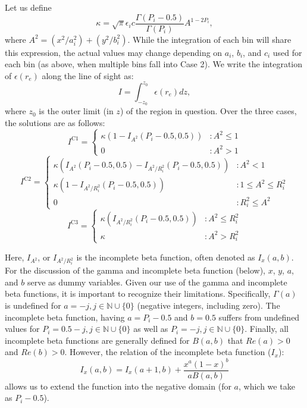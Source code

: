 \documentclass[twocolumn,traditabstract]{aa}
\begin{document}
Let us define
\begin{equation}
  \kappa = \sqrt{\pi}\epsilon_i c \frac{\Gamma(P_i-0.5)}{\Gamma(P_i)}A^{1-2P_i},
\end{equation}
where $A^2 = (x^2 / a_i^2) + (y^2 / b_i^2)$. While the integration of each bin will share this expression,
the actual values may change depending on $a_i$, $b_i$, and $c_i$ used for
each bin (as above, when multiple bins fall into Case 2). We write the  integration of $\epsilon(r_e)$ along the line of sight as:
\begin{equation}
  I = \int_{-z_0}^{z_0} \epsilon(r_e) dz,
  \label{eqn:los_int_setup}
\end{equation}
where $z_0$ is the outer limit (in $z$) of the region in question. Over the three cases, the solutions are as follows:
\begin{equation}
  I^{\text{C1}} = \left\{
  \begin{array}{lr}
    \kappa (1-I_{A^2}(P_i-0.5,0.5)) &: A^2 \leq 1 \\
    0 &: A^2 > 1
  \end{array}
  \right.
  \label{eqn:case1_int}
\end{equation}
\begin{equation}
  I^{\text{C2}} = \left\{
  \begin{array}{lr}
    \kappa (I_{A^2}(P_i-0.5,0.5)-I_{A^2/R_i^2}(P_i-0.5,0.5)) &: A^2 < 1 \\
    \kappa (1-I_{A^2/R_i^2}(P_i-0.5,0.5)) &: 1 \leq A^2 \leq R_i^2 \\
    0 &: R_i^2 \leq A^2
  \end{array}
  \right.
\end{equation}
\begin{equation}
  I^{\text{C3}} = \left\{
  \begin{array}{lr}
    \kappa (I_{A^2/R_i^2}(P_i-0.5,0.5)) &: A^2 \leq R_i^2 \\
    \kappa &: A^2 > R_i^2
  \end{array}
  \right.
\end{equation}

Here, $I_{A^2}$, or $I_{A^2/R_i^2}$ is the incomplete beta function, often denoted as $I_x(a,b)$. For the discussion of
the gamma and incomplete beta function (below), $x$, $y$, $a$, and $b$ serve as dummy variables. Given our use of
the gamma and incomplete beta functions, it is important to recognize their limitations.
Specifically, $\Gamma(a)$ is undefined for $a = -j, j \in \mathbb{N} \cup \{0\}$ (negative integers, including
zero). The incomplete beta function, having $a = P_i -0.5$ and $b = 0.5$ suffers from undefined values
for $P_i = 0.5-j, j \in \mathbb{N} \cup \{0\}$ as well as $P_i = -j, j \in \mathbb{N} \cup \{0\}$. Finally, all incomplete
beta functions are generally defined for $B(a,b)$ that $Re(a) > 0$ and $Re(b) > 0$. However, the relation of the
incomplete beta function ($I_x$):
\begin{equation}
  I_x(a,b) = I_x(a+1,b) + \frac{x^a (1-x)^b}{a B(a,b)}
  \label{eqn:recibeta}
\end{equation}
allows us to extend the function into the negative domain (for $a$, which we take as $P_i-0.5$). 
\end{document}
